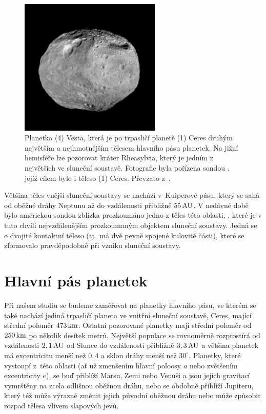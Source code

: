 \documentclass[A4paper, 12pt, oneside]{book}
\begin{document}
\begin{figure}
	\centering
	\includegraphics[width=0.6\textwidth]{obr/vesta.jpg}
	\caption{Planetka (4) Vesta, která je po trpasličí planetě (1) Ceres druhým největším a nejhmotnějším tělesem hlavního pásu planetek. Na jižní hemisféře lze pozorovat kráter Rheasylvia, který je jedním z největších ve sluneční soustavě. Fotografie byla pořízena sondou , jejíž cílem bylo i těleso (1) Ceres. Převzato z~\cite{jplvesta}.}
\end{figure}

Většina těles vnější sluneční soustavy se nachází v~Kuiperově pásu, který se sahá od oběžné dráhy Neptunu až do vzdálenosti přibližně $55\, {\rm AU}$. V nedávné době bylo americkou sondou  zblízka prozkoumáno jedno z těles této oblasti, , které je v tuto chvíli nejvzdálenějším prozkoumaným objektem sluneční soustavy. Jedná se o dvojité kontaktní těleso (tj.\ má dvě pevně spojené kulovité části), které se zformovalo pravděpodobně při vzniku sluneční soustavy.~\cite{ultimathule}


\pagebreak
\section{Hlavní pás planetek}
Při našem studiu se budeme zaměřovat na planetky hlavního pásu, ve kterém se také nachází jediná trpasličí planeta ve vnitřní sluneční soustavě, Ceres, mající střední poloměr $473\, {\rm km}$. Ostatní pozorované planetky mají střední poloměr od $250\, {\rm km}$ po několik desítek metrů. Největší populace se rovnoměrně rozprostírá od vzdálenosti $2,1\, {\rm AU}$ od Slunce do vzdálenosti přibližně $3,3\, {\rm AU}$ a většina planetek má excentricitu menší než $0,4$ a sklon dráhy menší než $30^\circ$. Planetky, které vystoupí z~této oblasti (ať už zmenšením hlavní poloosy $a$ nebo zvětšením excentricity $e$), se buď přiblíží Marsu, Zemi nebo Venuši a jsou jejich gravitací vymrštěny na zcela odlišnou oběžnou dráhu, nebo se obdobně přiblíží Jupiteru, který též může výrazně změnit jejich původní oběžnou dráhu nebo může způsobit rozpad tělesa vlivem slapových jevů.
\end{document}
